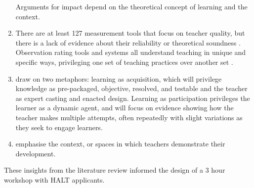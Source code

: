 \begin{enumerate}
    Arguments for impact depend on the theoretical concept of learning and the context.

    \item There are at least 127 measurement tools that focus on teacher quality, but there is a lack of evidence about their reliability or theoretical soundness  \parencite{vanderschaafEvidenceMeasuringTeachers2019}. Observation rating tools and systems all understand teaching in unique and specific ways, privileging one set of teaching practices over another set  \parencite{bellQualitiesClassroomObservation2019}. 
    
    \item \textcite{alteratorEncapsulatingTeacherExpertise2018} draw on  two metaphors: learning as acquisition, which will privilege knowledge as pre-packaged, objective, resolved, and testable and the teacher as expert casting and enacted design. Learning as participation privileges the learner as a dynamic agent, and will focus on evidence showing how the teacher makes multiple attempts, often repeatedly with slight variations as they seek to engage learners.
    
    \item \textcite{ryanSpatialisedMetaphorsPractice2016} emphasise the context, or spaces in which teachers demonstrate their development.
    
\end{enumerate}

These insights from the literature review informed the design of a 3 hour workshop with HALT applicants. 



